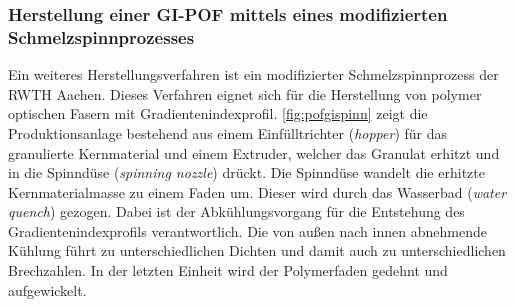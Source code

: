 
\subsubsection{Herstellung einer GI-POF mittels eines modifizierten Schmelzspinnprozesses}

Ein weiteres Herstellungsverfahren ist ein modifizierter Schmelzspinnprozess der
RWTH Aachen. Dieses Verfahren eignet sich für die Herstellung von polymer
optischen Fasern mit Gradientenindexprofil. \autoref{fig:pofgispinn} zeigt die
Produktionsanlage bestehend aus einem Einfülltrichter (\textit{hopper}) für das
granulierte Kernmaterial und einem Extruder, welcher das Granulat erhitzt und in
die Spinndüse (\textit{spinning nozzle}) drückt. Die Spinndüse wandelt die
erhitzte Kernmaterialmasse zu einem Faden um. Dieser wird durch das Wasserbad
(\textit{water quench}) gezogen. Dabei ist der Abkühlungsvorgang für die
Entstehung des Gradientenindexprofils verantwortlich. Die von außen nach innen
abnehmende Kühlung führt zu unterschiedlichen Dichten und damit auch zu
unterschiedlichen Brechzahlen. In der letzten Einheit wird der Polymerfaden
gedehnt und aufgewickelt.

